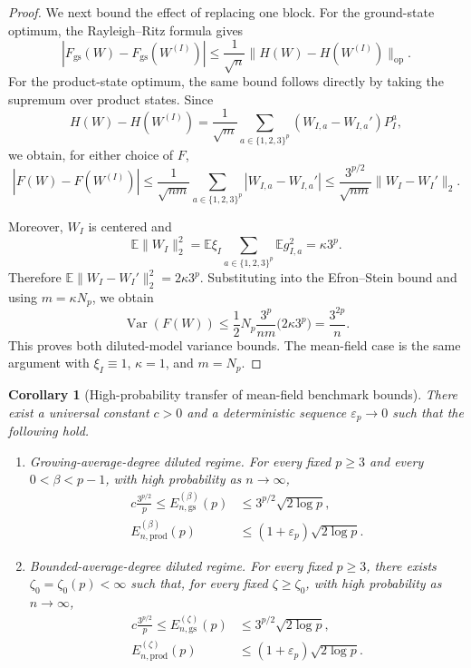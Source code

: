 \documentclass[12pt]{article}
\newtheorem{corollary}[theorem]{Corollary}
\newcommand{\E}{\mathbb{E}}
\begin{document}
\begin{appendix}
\begin{proof}
We next bound the effect of replacing one block. For the ground-state
optimum, the Rayleigh--Ritz formula gives
\[
    |
    F_{\mathrm{gs}}(W)-F_{\mathrm{gs}}(W^{(I)})
    |
    \le
    \frac1{\sqrt n}
    \|
        H(W)-H(W^{(I)})
    \|_{\mathrm{op}}.
\]
For the product-state optimum, the same bound follows directly by taking
the supremum over product states. Since
\[
    H(W)-H(W^{(I)})
    =
    \frac1{\sqrt m}
    \sum_{a\in\{1,2,3\}^p}
    (W_{I,a}-W_{I,a}')P_I^a,
\]
we obtain, for either choice of \(F\),
\[
    |F(W)-F(W^{(I)})|
    \le
    \frac1{\sqrt{nm}}
    \sum_{a\in\{1,2,3\}^p}
    |W_{I,a}-W_{I,a}'|
    \le
    \frac{3^{p/2}}{\sqrt{nm}}
    \|W_I-W_I'\|_2.
\]

Moreover, \(W_I\) is centered and
\[
    \E\|W_I\|_2^2
    =
    \E\xi_I
    \sum_{a\in\{1,2,3\}^p}
    \E g_{I,a}^2
    =
    \kappa 3^p.
\]
Therefore $\E\|W_I-W_I'\|_2^2
    =
    2\kappa 3^p$. Substituting into the Efron--Stein bound and using \(m=\kappa N_p\), we obtain
\[
    \operatorname{Var}(F(W))
    \le
    \frac12 N_p
    \frac{3^p}{nm}
    \bigl(2\kappa 3^p\bigr) 
    =
    \frac{3^{2p}}{n}.
\]
This proves both diluted-model variance bounds. The mean-field case is the same argument with \(\xi_I\equiv1\), \(\kappa=1\), and \(m=N_p\).
\end{proof}

\begin{corollary}[High-probability transfer of mean-field benchmark bounds]
\label{cor:sparse-mean-field-transfer-hp}
There exist a universal constant \(c>0\) and a deterministic sequence
\(\varepsilon_p\to0\) such that the following hold.

\begin{enumerate}
\item[\textup{(i)}] \textup{Growing-average-degree diluted regime.}
For every fixed \(p\ge3\) and every \(0<\beta<p-1\), with high
probability as \(n\to\infty\),
\begin{align*}
    c\frac{3^{p/2}}{p}
    \le
    E_{n,\mathrm{gs}}^{(\beta)}(p)
    &\le
    3^{p/2}\sqrt{2\log p}, \\
    E_{n,\mathrm{prod}}^{(\beta)}(p)
    &\le
    (1+\varepsilon_p)\sqrt{2\log p}.
\end{align*}

\item[\textup{(ii)}] \textup{Bounded-average-degree diluted regime.}
For every fixed \(p\ge3\), there exists
\(\zeta_0=\zeta_0(p)<\infty\) such that, for every fixed
\(\zeta\ge\zeta_0\), with high probability as \(n\to\infty\),
\begin{align*}
    c\frac{3^{p/2}}{p}
    \le
    E_{n,\mathrm{gs}}^{(\zeta)}(p)
    &\le
    3^{p/2}\sqrt{2\log p}, \\
    E_{n,\mathrm{prod}}^{(\zeta)}(p)
    &\le
    (1+\varepsilon_p)\sqrt{2\log p}.
\end{align*}
\end{enumerate}
\end{corollary}


\end{appendix}
\end{document}
